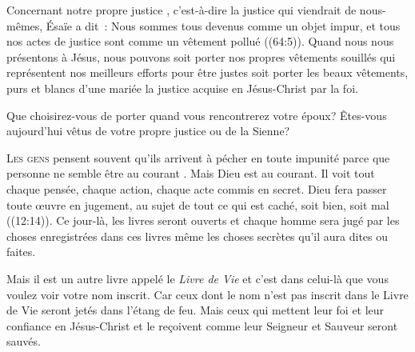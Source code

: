 
Concernant notre \og propre justice \fg{}, c'est-à-dire la justice
 qui viendrait de nous-mêmes, Ésaïe a dit~: 
 \og Nous sommes tous devenus comme un objet impur,
 et tous nos actes de justice sont comme un vêtement pollué \fg{}
 ((64:5)). Quand nous nous présentons à Jésus,
 nous pouvons soit porter nos propres vêtements souillés
 \ocadr qui représentent nos meilleurs efforts pour être justes \fcadr{}
 soit porter les beaux vêtements, purs et blancs d'une mariée
 \ocadr la justice acquise en Jésus-Christ par la foi. 

Que choisirez-vous de porter quand vous rencontrerez votre époux?
 Êtes-vous aujourd'hui vêtus de votre propre justice ou de la Sienne? 

\dvrule






\lettrine{L}{es gens} pensent souvent qu'ils arrivent à pécher
 en toute impunité parce que personne ne semble être au courant
 .
 Mais Dieu est au courant. Il voit tout \ocadr chaque pensée,
 chaque action, chaque acte commis en secret.
 \og Dieu fera passer toute œuvre en jugement,
 au sujet de tout ce qui est caché, soit bien, soit mal \fg{}
 ((12:14)).
 Ce jour-là, les livres seront ouverts et chaque homme
 sera jugé par les choses enregistrées dans ces livres
 \ocadr même les choses secrètes qu'il aura dites ou faites. 

Mais il est un autre livre appelé le \emph{Livre de Vie}
 et c'est dans celui-là que vous voulez voir votre nom inscrit.
 Car ceux dont le nom n'est pas inscrit dans le Livre de Vie
 seront jetés dans l'étang de feu.
 Mais ceux qui mettent leur foi et leur confiance en Jésus-Christ
 et le reçoivent comme leur Seigneur et Sauveur seront sauvés. 

